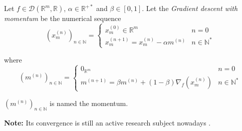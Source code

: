 \documentclass[11pt,en]{elegantpaper}
\newcommand{\Real}{\mathbb{R}}
\begin{document}
\begin{definition}
  Let $f \in \mathcal{D}(\Real^m,\Real)$, $\alpha \in \Real^{+*}$ and $\beta \in [0,1]$. Let the \textit{Gradient descent with momentum}
  be the numerical sequence \begin{equation}
    (x_m^{(n)})_{n \in \mathbb{N}} = \left\{
      \begin{array}{ll}
        x_m^{(0)} \in \Real^m & n = 0 \\
        x_m^{(n+1)} = x_m^{(n)} - \alpha m^{(n)} & n \in \mathbb{N}^*
      \end{array}
    \right.
  \end{equation} \par

  where \begin{equation*}
    (m^{(n)})_{n \in \mathbb{N}} = \left\{
      \begin{array}{ll}
        0_{\Real^m} & n = 0 \\
        m^{(n+1)} = \beta m^{(n)} + (1 - \beta) \nabla_f(x_m^{(n)}) & n \in \mathbb{N}^*
      \end{array}
    \right.
  \end{equation*} \par

  $(m^{(n)})_{n \in \mathbb{N}}$ is named the momentum.

  \textbf{Note:} Its convergence is still an active research subject nowadays \citep{gradconv_momentum:1}.
\end{definition}
\end{document}
